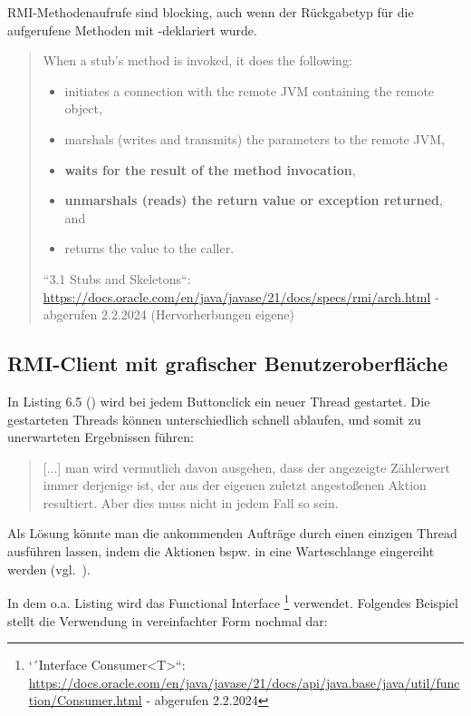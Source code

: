 \begin{tcolorbox}[enlarge top by=0.5cm,enlarge bottom by=0.5cm]
    RMI-Methodenaufrufe sind blocking, auch wenn der Rückgabetyp für die aufgerufene Methoden mit -deklariert wurde.\\

    \blockquote[{``3.1 Stubs and Skeletons``: \url{https://docs.oracle.com/en/java/javase/21/docs/specs/rmi/arch.html} - abgerufen 2.2.2024 (Hervorherbungen eigene)}]{
        When a stub's method is invoked, it does the following:
        \begin{itemize}
            \item initiates a connection with the remote JVM containing the remote object,
            \item marshals (writes and transmits) the parameters to the remote JVM,
            \item \textbf{waits for the result of the method invocation},
            \item \textbf{unmarshals (reads) the return value or exception returned}, and
            \item returns the value to the caller.
        \end{itemize}

    }
\end{tcolorbox}

\subsection{RMI-Client mit grafischer Benutzeroberfläche}

In Listing 6.5 (\cite[320]{Oec22}) wird bei jedem Buttonclick ein neuer Thread gestartet.
Die gestarteten Threads können unterschiedlich schnell ablaufen, und somit zu unerwarteten Ergebnissen führen:

\blockquote[{\cite[323]{Oec22}}]{
[...] man wird vermutlich davon ausgehen, dass der angezeigte Zählerwert immer derjenige ist, der aus der eigenen zuletzt angestoßenen Aktion resultiert.
    Aber dies muss nicht in jedem Fall so sein.
}

Als Lösung könnte man die ankommenden Aufträge durch einen einzigen Thread ausführen lassen, indem die Aktionen {bspw.} in eine Warteschlange eingereiht werden (vgl.~\cite[323]{Oec22}).

\newpage
In dem o.a. Listing wird das Functional Interface \footnote{
`´Interface Consumer<T>``: \url{https://docs.oracle.com/en/java/javase/21/docs/api/java.base/java/util/function/Consumer.html} - abgerufen 2.2.2024
} verwendet.
Folgendes Beispiel stellt die Verwendung in vereinfachter Form nochmal dar:


